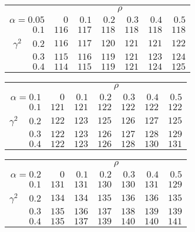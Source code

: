 \begin{tabular}{r|rrrrrr}
\hline\hline
 &\multicolumn{6}{c}{$\rho$} \\ 
 $\alpha = 0.05$ & $0$ & $0.1$ & $0.2$ & $0.3$ & $0.4$ & $0.5$ \\ 
 \hline$0.1$ & $116$ & $117$ & $118$ & $118$ & $118$ & $118$\\ 
$\gamma^2\;\;\;$ $0.2$ & $116$ & $117$ & $120$ & $121$ & $121$ & $122$\\ 
$0.3$ & $115$ & $116$ & $119$ & $121$ & $123$ & $124$\\ 
$0.4$ & $114$ & $115$ & $119$ & $121$ & $124$ & $125$\\ 
 \hline 
 \end{tabular}
 
 \vspace{2em} 
 
\begin{tabular}{r|rrrrrr}
\hline\hline
 &\multicolumn{6}{c}{$\rho$} \\ 
 $\alpha = 0.1$ & $0$ & $0.1$ & $0.2$ & $0.3$ & $0.4$ & $0.5$ \\ 
 \hline$0.1$ & $121$ & $121$ & $122$ & $122$ & $122$ & $122$\\ 
$\gamma^2\;\;\;$ $0.2$ & $122$ & $123$ & $125$ & $126$ & $127$ & $125$\\ 
$0.3$ & $122$ & $123$ & $126$ & $127$ & $128$ & $129$\\ 
$0.4$ & $122$ & $123$ & $126$ & $128$ & $130$ & $131$\\ 
 \hline 
 \end{tabular}
 
 \vspace{2em} 
 
\begin{tabular}{r|rrrrrr}
\hline\hline
 &\multicolumn{6}{c}{$\rho$} \\ 
 $\alpha = 0.2$ & $0$ & $0.1$ & $0.2$ & $0.3$ & $0.4$ & $0.5$ \\ 
 \hline$0.1$ & $131$ & $131$ & $130$ & $130$ & $131$ & $129$\\ 
$\gamma^2\;\;\;$ $0.2$ & $134$ & $134$ & $135$ & $136$ & $136$ & $135$\\ 
$0.3$ & $135$ & $136$ & $137$ & $138$ & $139$ & $139$\\ 
$0.4$ & $135$ & $137$ & $139$ & $140$ & $140$ & $141$\\ 
 \hline 
 \end{tabular}
